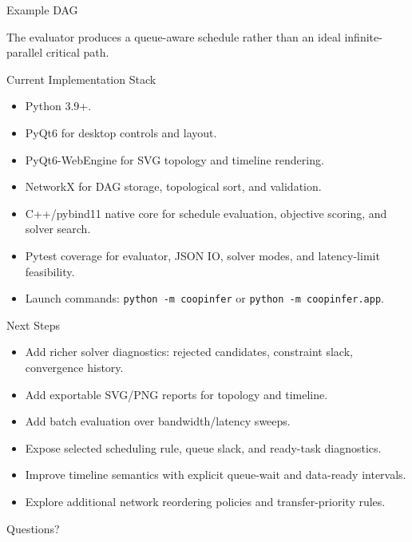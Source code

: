 \documentclass[aspectratio=169]{beamer}
\newcommand{\device}{\textsf{Device}}
\newcommand{\host}{\textsf{Host}}
\begin{document}
\begin{frame}{Example DAG}
  \centering
  \vspace{1em}

  The evaluator produces a queue-aware schedule rather than an ideal infinite-parallel critical path.
\end{frame}

\begin{frame}{Current Implementation Stack}
  \begin{itemize}
    \item Python 3.9+.
    \item PyQt6 for desktop controls and layout.
    \item PyQt6-WebEngine for SVG topology and timeline rendering.
    \item NetworkX for DAG storage, topological sort, and validation.
    \item C++/pybind11 native core for schedule evaluation, objective scoring, and solver search.
    \item Pytest coverage for evaluator, JSON IO, solver modes, and latency-limit feasibility.
    \item Launch commands: \texttt{python -m coopinfer} or \texttt{python -m coopinfer.app}.
  \end{itemize}
\end{frame}

\begin{frame}{Next Steps}
  \begin{itemize}
    \item Add richer solver diagnostics: rejected candidates, constraint slack, convergence history.
    \item Add exportable SVG/PNG reports for topology and timeline.
    \item Add batch evaluation over bandwidth/latency sweeps.
    \item Expose selected scheduling rule, queue slack, and ready-task diagnostics.
    \item Improve timeline semantics with explicit queue-wait and data-ready intervals.
    \item Explore additional network reordering policies and transfer-priority rules.
  \end{itemize}
\end{frame}

\begin{frame}
  \centering
  \Huge Questions?
\end{frame}
\end{document}
